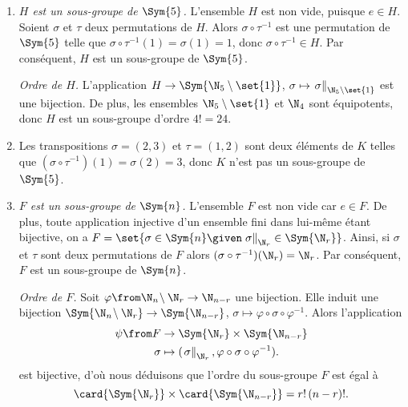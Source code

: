 \begin{enumerate}
  \item %
    \emph{$H$ est un sous-groupe de $\Sym{5}$.}
    L'ensemble $H$ est non vide, puisque $e\in H$.
    Soient $\sigma$ et $\tau$ deux permutations de $H$.
    Alors $\sigma\circ\tau^{-1}$ est une permutation de $\Sym{5}$ telle que $\sigma\circ\tau^{-1}(1) = \sigma(1) = 1$, donc $\sigma\circ\tau^{-1}\in H$.
    Par conséquent, $H$ est un sous-groupe de $\Sym{5}$.

    \emph{Ordre de $H$.}
    L'application $H\to\Sym{\N_5\setminus\set{1}}$, $\sigma\mapsto \left.\sigma\right\|_{\N_5\setminus\set{1}}$ est une bijection. 
    De plus, les ensembles $\N_5\setminus\set{1}$ et $\N_4$ sont équipotents, donc $H$ est un sous-groupe d'ordre $4! = 24$.

  \item %
    Les transpositions $\sigma = (2,3)$ et $\tau = (1,2)$ sont deux éléments de $K$ telles que $(\sigma\circ\tau^{-1})(1) = \sigma(2) = 3$, donc $K$ n'est pas un sous-groupe de $\Sym{5}$.

  \item %
    \emph{$F$ est un sous-groupe de $\Sym{n}$.}
    L'ensemble $F$ est non vide car $e\in F$.
    De plus, toute application injective d'un ensemble fini dans lui-même étant bijective, on a $F = \set{\sigma\in\Sym{n} \given \left.\sigma\right\|_{\N_r}\in\Sym{\N_r}}$.
    Ainsi, si $\sigma$ et $\tau$ sont deux permutations de $F$ alors $(\sigma\circ\tau^{-1})(\N_r) = \N_r$.
    Par conséquent, $F$ est un sous-groupe de $\Sym{n}$.

    \emph{Ordre de $F$.}
    Soit $\varphi\from\N_n\!\setminus\N_r\to\N_{n-r}$ une bijection.
    Elle induit une bijection $\Sym{\N_n\!\setminus\N_r}\to\Sym{\N_{n-r}}$, $\sigma\mapsto\varphi\circ\sigma\circ\varphi^{-1}$.
    Alors l'application
    \begin{align*}
      \psi\from F &\to\Sym{\N_r}\times\Sym{\N_{n-r}} \\
      \sigma &\mapsto (\left.\sigma\right\|_{\N_r},\varphi\circ\sigma\circ\varphi^{-1}).
    \end{align*}
    est bijective, d'où nous déduisons que l'ordre du sous-groupe $F$ est égal à
    \[
      \card{\Sym{\N_r}}\times\card{\Sym{\N_{n-r}}} = r!\,(n-r)!.
    \]
\end{enumerate}
